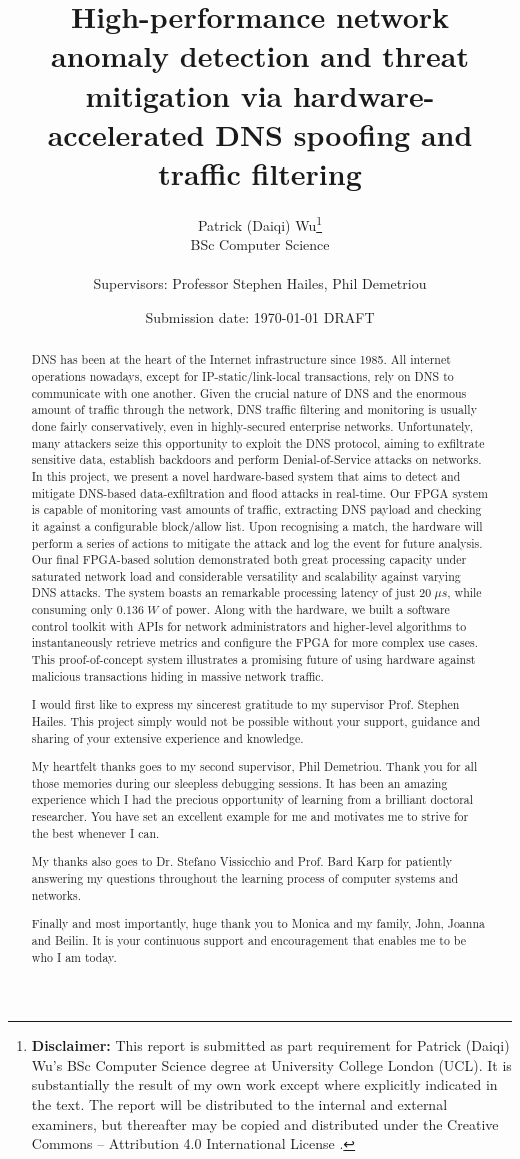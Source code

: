 \documentclass[a4paper]{report}
\title{{\vspace{-14em}}
{{\Huge High-performance network anomaly detection and threat mitigation via hardware-accelerated DNS spoofing and traffic filtering}} \\
{\large}}
\date{Submission date: \today \; DRAFT}
\author{Patrick (Daiqi) Wu\thanks{
{\bf Disclaimer:}
This report is submitted as part requirement for Patrick (Daiqi) Wu's BSc Computer Science degree at University College London (UCL). It is
substantially the result of my own work except where explicitly indicated in the text.
The report will be distributed to the internal and external examiners, but thereafter may be copied and distributed under the Creative Commons -- Attribution 4.0 International License \cite{cc-by-4.0}.}
\\
BSc Computer Science\\ \\
Supervisors: Professor Stephen Hailes, Phil Demetriou}
\begin{document}
 
\onehalfspacing
\maketitle
\begin{abstract}
DNS has been at the heart of the Internet infrastructure since 1985. All internet operations nowadays, except for IP-static/link-local transactions, rely on DNS to communicate with one another. Given the crucial nature of DNS and the enormous amount of traffic through the network, DNS traffic filtering and monitoring is usually done fairly conservatively, even in highly-secured enterprise networks. Unfortunately, many attackers seize this opportunity to exploit the DNS protocol, aiming to exfiltrate sensitive data, establish backdoors and perform Denial-of-Service attacks on networks. In this project, we present a novel hardware-based system that aims to detect and mitigate DNS-based data-exfiltration and flood attacks in real-time. Our FPGA system is capable of monitoring vast amounts of traffic, extracting DNS payload and checking it against a configurable block/allow list. Upon recognising a match, the hardware will perform a series of actions to mitigate the attack and log the event for future analysis. Our final FPGA-based solution demonstrated both great processing capacity under saturated network load and considerable versatility and scalability against varying DNS attacks. The system boasts an remarkable processing latency of just $20\; \mu s$, while consuming only $0.136 \; W$ of power. Along with the hardware, we built a software control toolkit with APIs for network administrators and higher-level algorithms to instantaneously retrieve metrics and configure the FPGA for more complex use cases. This proof-of-concept system illustrates a promising future of using hardware against malicious transactions hiding in massive network traffic.
\end{abstract}

\renewcommand{\abstractname}{Acknowledgements}
\begin{abstract}
I would first like to express my sincerest gratitude to my supervisor Prof. Stephen Hailes. This project simply would not be possible without your support, guidance and sharing of your extensive experience and knowledge.

My heartfelt thanks goes to my second supervisor, Phil Demetriou. Thank you for all those memories during our sleepless debugging sessions. It has been an amazing experience which I had the precious opportunity of learning from a brilliant doctoral researcher. You have set an excellent example for me and motivates me to strive for the best whenever I can.

My thanks also goes to Dr. Stefano Vissicchio and Prof. Bard Karp for patiently answering my questions throughout the learning process of computer systems and networks.

Finally and most importantly, huge thank you to Monica and my family, John, Joanna and Beilin. It is your continuous support and encouragement that enables me to be who I am today.
\end{abstract}
\end{document}

